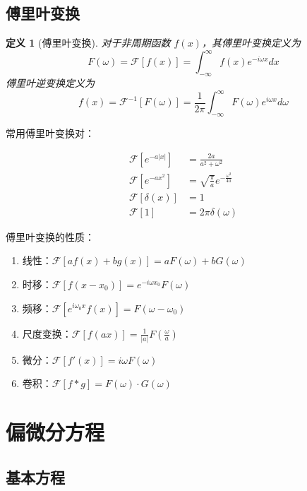 \documentclass[12pt]{article}
\newtheorem{definition}{定义}
\begin{document}
\subsection{傅里叶变换}

\begin{definition}[傅里叶变换]
对于非周期函数 $f(x)$，其傅里叶变换定义为
$$F(\omega) = \mathcal{F}[f(x)] = \int_{-\infty}^{\infty} f(x) e^{-i\omega x} dx$$
傅里叶逆变换定义为
$$f(x) = \mathcal{F}^{-1}[F(\omega)] = \frac{1}{2\pi} \int_{-\infty}^{\infty} F(\omega) e^{i\omega x} d\omega$$
\end{definition}

常用傅里叶变换对：

\begin{align}
\mathcal{F}[e^{-a|x|}] &= \frac{2a}{a^2 + \omega^2} \\
\mathcal{F}[e^{-ax^2}] &= \sqrt{\frac{\pi}{a}} e^{-\frac{\omega^2}{4a}} \\
\mathcal{F}[\delta(x)] &= 1 \\
\mathcal{F}[1] &= 2\pi\delta(\omega)
\end{align}

傅里叶变换的性质：

\begin{enumerate}
    \item 线性：$\mathcal{F}[af(x) + bg(x)] = aF(\omega) + bG(\omega)$
    \item 时移：$\mathcal{F}[f(x - x_0)] = e^{-i\omega x_0} F(\omega)$
    \item 频移：$\mathcal{F}[e^{i\omega_0 x} f(x)] = F(\omega - \omega_0)$
    \item 尺度变换：$\mathcal{F}[f(ax)] = \frac{1}{|a|} F\left(\frac{\omega}{a}\right)$
    \item 微分：$\mathcal{F}[f'(x)] = i\omega F(\omega)$
    \item 卷积：$\mathcal{F}[f * g] = F(\omega) \cdot G(\omega)$
\end{enumerate}


\section{偏微分方程}

\subsection{基本方程}
\end{document}
